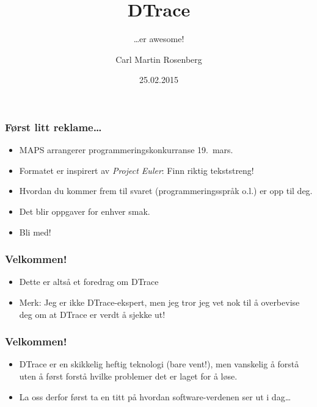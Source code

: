 \documentclass{beamer}
\title{DTrace}
\subtitle{…er awesome!}
\author{Carl Martin Rosenberg}
\institute{MAPS}
\date{25.02.2015}
\begin{document}
\frame{\titlepage}

\begin{frame}
\frametitle{Først litt reklame…}

\begin{itemize}
    \item MAPS arrangerer programmeringskonkurranse 19.\ mars.
 \item Formatet er inspirert av \emph{Project Euler}: Finn riktig
     tekststreng!
 \item Hvordan du kommer frem til svaret (programmeringsspråk o.l.)
     er opp til deg.
 \item Det blir oppgaver for enhver smak.
 \item Bli med!
\end{itemize}

\end{frame}

\begin{frame}
\frametitle{Velkommen!}

\begin{itemize}
    \item Dette er altså et foredrag om DTrace

    \item Merk: Jeg er ikke DTrace-ekspert, men jeg tror jeg
        vet nok til å overbevise deg om at DTrace er verdt å sjekke ut!
\end{itemize}
\end{frame}
\begin{frame}
\frametitle{Velkommen!}
\begin{itemize}

    \item DTrace er en skikkelig heftig teknologi (bare vent!),
    men vanskelig å forstå uten å først forstå hvilke problemer
    det er laget for å løse.

    \item La oss derfor først ta en titt på
    hvordan software-verdenen ser ut i dag…
\end{itemize}

\end{frame}
\end{document}
